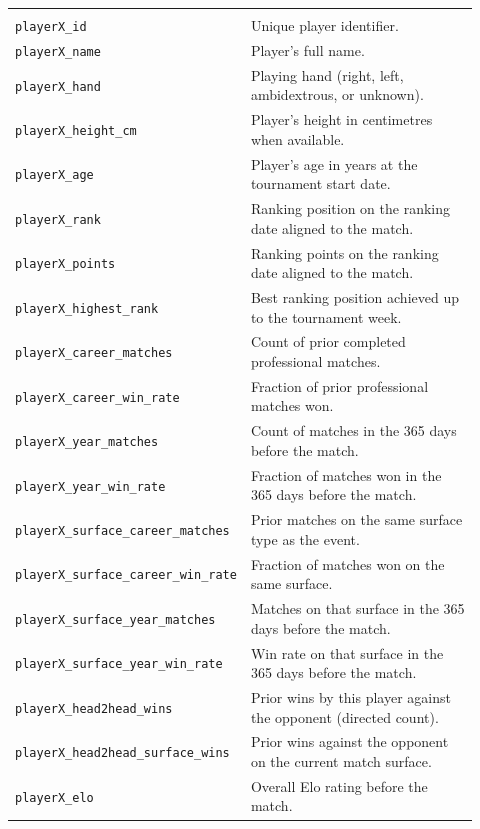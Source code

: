 {\begin{longtable}{@{}>{\raggedright\arraybackslash}p{0.4\linewidth}p{0.52\linewidth}@{}}
  \multicolumn{2}{@{}l}{\textit{Per-player fields (replace \texttt{X} with \texttt{1} and \texttt{2})}} \\
  \texttt{playerX\_id} &
    Unique player identifier. \\
  \texttt{playerX\_name} &
    Player's full name. \\
  \texttt{playerX\_hand} &
    Playing hand (right, left, ambidextrous, or unknown). \\
  \texttt{playerX\_height\_cm} &
    Player's height in centimetres when available. \\
  \texttt{playerX\_age} &
    Player's age in years at the tournament start date. \\
  \texttt{playerX\_rank} &
    Ranking position on the ranking date aligned to the match. \\
  \texttt{playerX\_points} &
    Ranking points on the ranking date aligned to the match. \\
  \texttt{playerX\_highest\_rank} &
    Best ranking position achieved up to the tournament week. \\
  \texttt{playerX\_career\_matches} &
    Count of prior completed professional matches. \\
  \texttt{playerX\_career\_win\_rate} &
    Fraction of prior professional matches won. \\
  \texttt{playerX\_year\_matches} &
    Count of matches in the 365 days before the match. \\
  \texttt{playerX\_year\_win\_rate} &
    Fraction of matches won in the 365 days before the match. \\
  \texttt{playerX\_surface\_career\_matches} &
    Prior matches on the same surface type as the event. \\
  \texttt{playerX\_surface\_career\_win\_rate} &
    Fraction of matches won on the same surface. \\
  \texttt{playerX\_surface\_year\_matches} &
    Matches on that surface in the 365 days before the match. \\
  \texttt{playerX\_surface\_year\_win\_rate} &
    Win rate on that surface in the 365 days before the match. \\
  \texttt{playerX\_head2head\_wins} &
    Prior wins by this player against the opponent (directed count). \\
  \texttt{playerX\_head2head\_surface\_wins} &
    Prior wins against the opponent on the current match surface. \\
  \texttt{playerX\_elo} &
    Overall Elo rating before the match. \\

\end{longtable}}
